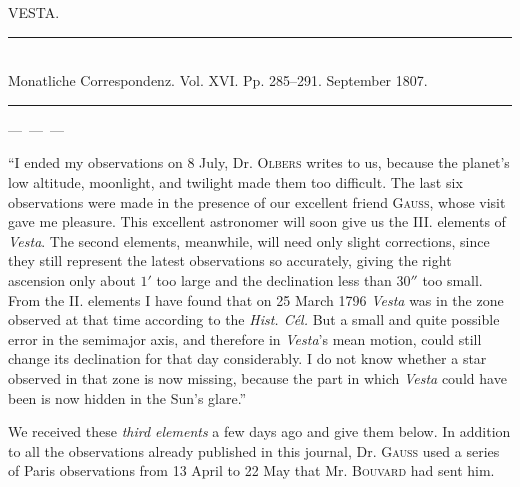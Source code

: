 \clearpage
{}
\hypertarget{native-295-lower}{}
\centerline{VESTA.}

\begin{center}
\rule{0.5\linewidth}{0.4pt}\\[2pt]
Monatliche Correspondenz. Vol. XVI. Pp. 285–291. September 1807.\\[2pt]
\rule{0.5\linewidth}{0.4pt}
\end{center}

\smallskip
\noindent---\ ---\ ---

\smallskip
\par\indent “I ended my observations on 8 July, Dr. \textsc{Olbers} writes to us, because the planet’s low altitude, moonlight, and twilight made them too difficult. The last six observations were made in the presence of our excellent friend \textsc{Gauss}, whose visit gave me pleasure. This excellent astronomer will soon give us the III. elements of \emph{Vesta}. The second elements, meanwhile, will need only slight corrections, since they still represent the latest observations so accurately, giving the right ascension only about $1'$ too large and the declination less than $30''$ too small. From the II. elements I have found that on 25 March 1796 \emph{Vesta} was in the zone observed at that time according to the \emph{Hist. Cél.} But a small and quite possible
error in the semimajor axis, and therefore in \emph{Vesta}’s mean motion, could still change its declination for that day considerably. I do not know whether a star observed in that zone is now missing, because the part in which \emph{Vesta} could have been is now hidden in the Sun’s glare.”

\par\indent We received these \emph{third elements} a few days ago and give them below. In addition to all the observations already published in this journal, Dr. \textsc{Gauss} used a series of Paris observations from 13 April to 22 May that Mr. \textsc{Bouvard} had sent him.

\smallskip

